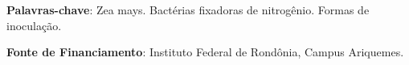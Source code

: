 \documentclass[article,12pt,onesidea,4paper,english,brazil]{abntex2}
\begin{document}
	\vspace{\onelineskip}
	
	\noindent
	\textbf{Palavras-chave}: Zea mays. Bactérias fixadoras de nitrogênio. Formas de inoculação.
	
    \noindent 
    \textbf{Fonte de Financiamento}: Instituto Federal de Rondônia, Campus Ariquemes.
	
	
\end{document}

